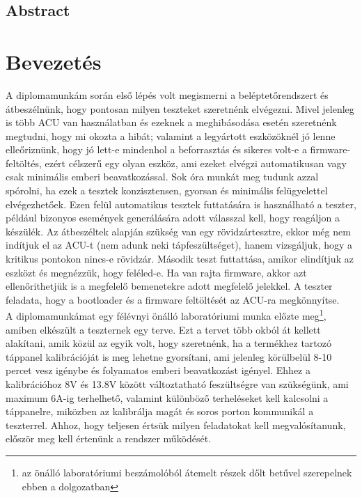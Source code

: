 \documentclass[a4paper, 12pt]{article}
\newcommand{\tab}{\hspace*{1em}}
\begin{document}
\thispagestyle{empty} %
\clearpage

\begin{otherlanguage}{english}

\section*{Abstract}


\end{otherlanguage}
\thispagestyle{empty} %
\clearpage


\section{Bevezetés}
\tab A diplomamunkám során első lépés volt megismerni a beléptetőrendszert és átbeszélnünk, hogy pontosan milyen teszteket szeretnénk elvégezni. Mivel jelenleg is több ACU van használatban és ezeknek a meghibásodása esetén szeretnénk megtudni, hogy mi okozta a hibát; valamint a legyártott eszközöknél jó lenne elleőriznünk, hogy jó lett-e mindenhol a beforrasztás és sikeres volt-e a firmware-feltöltés, ezért célszerű egy olyan eszköz, ami ezeket elvégzi automatikusan vagy csak minimális emberi beavatkozással. Sok óra munkát meg tudunk azzal spórolni, ha ezek a tesztek konzisztensen, gyorsan és minimális felügyelettel elvégezhetőek. Ezen felül automatikus tesztek futtatására is használható a teszter, például bizonyos események generálására adott válasszal kell, hogy reagáljon a készülék. Az átbeszéltek alapján szükség van egy rövidzártesztre, ekkor még nem indítjuk el az ACU-t (nem adunk neki tápfeszültséget), hanem vizsgáljuk, hogy a kritikus pontokon nincs-e rövidzár. Második teszt futtattása, amikor elindítjuk az eszközt és megnézzük, hogy feléled-e. Ha van rajta firmware, akkor azt ellenőrithetjük is a megfelelő bemenetekre adott megfelelő jelekkel. A teszter feladata, hogy a bootloader és a firmware feltöltését az ACU-ra megkönnyítse. \\
A diplomamunkámat egy félévnyi önálló laboratóriumi munka előzte meg\footnote{az önálló laboratóriumi beszámolóból átemelt részek dőlt betűvel szerepelnek ebben a dolgozatban}, amiben elkészült a teszternek egy terve. Ezt a tervet több okból át kellett alakítani, amik közül az egyik volt, hogy szeretnénk, ha a termékhez tartozó táppanel kalibrációját is meg lehetne gyorsítani, ami jelenleg körülbelül 8-10 percet vesz igénybe és folyamatos emberi beavatkozást igényel. Ehhez a kalibrációhoz 8V és 13.8V között változtatható feszültségre van szükségünk, ami maximum 6A-ig terhelhető, valamint különböző terheléseket kell kalcsolni a táppanelre, miközben az kalibrálja magát és soros porton kommunikál a teszterrel. Ahhoz, hogy teljesen értsük milyen feladatokat kell megvalósítanunk, először meg kell értenünk a rendszer működését.
\end{document}
